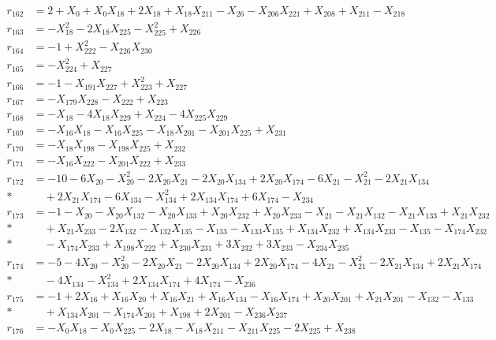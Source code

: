 \begin{align*}
r_{162} &= 2 + X_{0} + X_{0}X_{18} + 2X_{18} + X_{18}X_{211} - X_{26} - X_{206}X_{221} + X_{208} + X_{211} - X_{218} \\[3pt]
r_{163} &= -X_{18}^{2} - 2X_{18}X_{225} - X_{225}^{2} + X_{226} \\[3pt]
r_{164} &= -1 + X_{222}^{2} - X_{226}X_{230} \\[3pt]
r_{165} &= -X_{224}^{2} + X_{227} \\[3pt]
r_{166} &= -1 - X_{191}X_{227} + X_{223}^{2} + X_{227} \\[3pt]
r_{167} &= -X_{179}X_{228} - X_{222} + X_{223} \\[3pt]
r_{168} &= -X_{18} - 4X_{18}X_{229} + X_{224} - 4X_{225}X_{229} \\[3pt]
r_{169} &= -X_{16}X_{18} - X_{16}X_{225} - X_{18}X_{201} - X_{201}X_{225} + X_{231} \\[3pt]
r_{170} &= -X_{18}X_{198} - X_{198}X_{225} + X_{232} \\[3pt]
r_{171} &= -X_{16}X_{222} - X_{201}X_{222} + X_{233} \\[3pt]
r_{172} &= -10 - 6X_{20} - X_{20}^{2} - 2X_{20}X_{21} - 2X_{20}X_{134} + 2X_{20}X_{174} - 6X_{21} - X_{21}^{2} - 2X_{21}X_{134} \\*
&\quad  + 2X_{21}X_{174} - 6X_{134} - X_{134}^{2} + 2X_{134}X_{174} + 6X_{174} - X_{234} \\[3pt]
r_{173} &= -1 - X_{20} - X_{20}X_{132} - X_{20}X_{133} + X_{20}X_{232} + X_{20}X_{233} - X_{21} - X_{21}X_{132} - X_{21}X_{133} + X_{21}X_{232} \\*
&\quad  + X_{21}X_{233} - 2X_{132} - X_{132}X_{135} - X_{133} - X_{133}X_{135} + X_{134}X_{232} + X_{134}X_{233} - X_{135} - X_{174}X_{232} \\*
&\quad  - X_{174}X_{233} + X_{198}X_{222} + X_{230}X_{231} + 3X_{232} + 3X_{233} - X_{234}X_{235} \\[3pt]
r_{174} &= -5 - 4X_{20} - X_{20}^{2} - 2X_{20}X_{21} - 2X_{20}X_{134} + 2X_{20}X_{174} - 4X_{21} - X_{21}^{2} - 2X_{21}X_{134} + 2X_{21}X_{174} \\*
&\quad  - 4X_{134} - X_{134}^{2} + 2X_{134}X_{174} + 4X_{174} - X_{236} \\[3pt]
r_{175} &= -1 + 2X_{16} + X_{16}X_{20} + X_{16}X_{21} + X_{16}X_{134} - X_{16}X_{174} + X_{20}X_{201} + X_{21}X_{201} - X_{132} - X_{133} \\*
&\quad  + X_{134}X_{201} - X_{174}X_{201} + X_{198} + 2X_{201} - X_{236}X_{237} \\[3pt]
r_{176} &= -X_{0}X_{18} - X_{0}X_{225} - 2X_{18} - X_{18}X_{211} - X_{211}X_{225} - 2X_{225} + X_{238} \\[3pt]

\end{align*}
